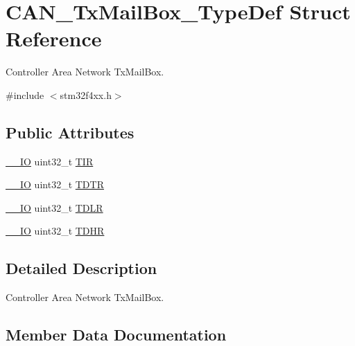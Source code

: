 \hypertarget{struct_c_a_n___tx_mail_box___type_def}{}\section{C\+A\+N\+\_\+\+Tx\+Mail\+Box\+\_\+\+Type\+Def Struct Reference}
\label{struct_c_a_n___tx_mail_box___type_def}


Controller Area Network Tx\+Mail\+Box.  




{\ttfamily \#include $<$stm32f4xx.\+h$>$}

\subsection*{Public Attributes}
\begin{DoxyCompactItemize}
\item 
\hyperlink{core__cm4_8h_aec43007d9998a0a0e01faede4133d6be}{\+\_\+\+\_\+\+IO} uint32\+\_\+t \hyperlink{struct_c_a_n___tx_mail_box___type_def_a22f525c909de2dcec1d4093fe1d562b8}{T\+IR}
\item 
\hyperlink{core__cm4_8h_aec43007d9998a0a0e01faede4133d6be}{\+\_\+\+\_\+\+IO} uint32\+\_\+t \hyperlink{struct_c_a_n___tx_mail_box___type_def_a2351cb865d064cf75f61642aaa887f76}{T\+D\+TR}
\item 
\hyperlink{core__cm4_8h_aec43007d9998a0a0e01faede4133d6be}{\+\_\+\+\_\+\+IO} uint32\+\_\+t \hyperlink{struct_c_a_n___tx_mail_box___type_def_a408c96501b1cc8bd527432736d132a39}{T\+D\+LR}
\item 
\hyperlink{core__cm4_8h_aec43007d9998a0a0e01faede4133d6be}{\+\_\+\+\_\+\+IO} uint32\+\_\+t \hyperlink{struct_c_a_n___tx_mail_box___type_def_a98c6bcd7c9bae378ebf83fd9f5b59020}{T\+D\+HR}
\end{DoxyCompactItemize}


\subsection{Detailed Description}
Controller Area Network Tx\+Mail\+Box. 

\subsection{Member Data Documentation}
